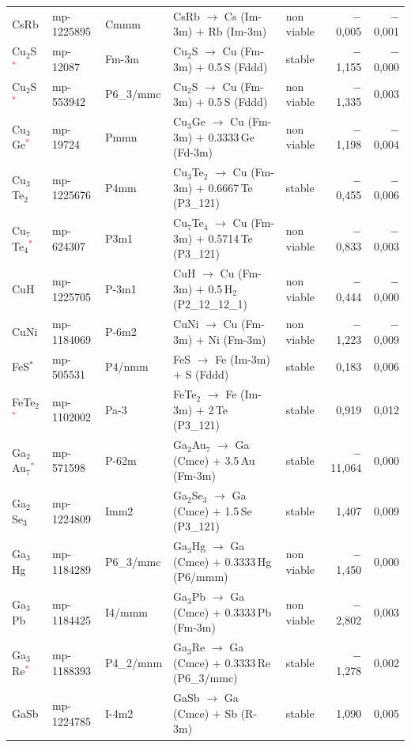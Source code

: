 \begin{longtable}{@{}ll l@{\hspace{4pt}} p{4.6cm} l@{\hspace{4pt}} rr@{}}
CsRb & mp-1225895 & Cmmm & CsRb $\to$ Cs (Im-3m) $+$ Rb (Im-3m) & non viable & $-$0{,}005 & $-$0{,}001 \\
Cu$_{2}$S\textcolor{red}{$^*$} & mp-12087 & Fm-3m & Cu$_{2}$S $\to$ Cu (Fm-3m) $+$ 0.5\,S (Fddd) & stable & $-$1{,}155 & $-$0{,}000 \\
Cu$_{2}$S\textcolor{red}{$^*$} & mp-553942 & P6\_3/mmc & Cu$_{2}$S $\to$ Cu (Fm-3m) $+$ 0.5\,S (Fddd) & non viable & $-$1{,}335 & 0{,}003 \\
Cu$_{3}$Ge\textcolor{red}{$^*$} & mp-19724 & Pmmn & Cu$_{3}$Ge $\to$ Cu (Fm-3m) $+$ 0.3333\,Ge (Fd-3m) & non viable & $-$1{,}198 & $-$0{,}004 \\
Cu$_{3}$Te$_{2}$ & mp-1225676 & P4mm & Cu$_{3}$Te$_{2}$ $\to$ Cu (Fm-3m) $+$ 0.6667\,Te (P3\_121) & stable & $-$0{,}455 & $-$0{,}006 \\
Cu$_{7}$Te$_{4}$\textcolor{red}{$^*$} & mp-624307 & P3m1 & Cu$_{7}$Te$_{4}$ $\to$ Cu (Fm-3m) $+$ 0.5714\,Te (P3\_121) & non viable & $-$0{,}833 & $-$0{,}003 \\
CuH & mp-1225705 & P-3m1 & CuH $\to$ Cu (Fm-3m) $+$ 0.5\,H$_{2}$ (P2\_12\_12\_1) & non viable & $-$0{,}444 & $-$0{,}000 \\
CuNi & mp-1184069 & P-6m2 & CuNi $\to$ Cu (Fm-3m) $+$ Ni (Fm-3m) & non viable & $-$1{,}223 & $-$0{,}009 \\
FeS$^*$ & mp-505531 & P4/nmm & FeS $\to$ Fe (Im-3m) $+$ S (Fddd) & stable & 0{,}183 & 0{,}006 \\
FeTe$_{2}$\textcolor{red}{$^*$} & mp-1102002 & Pa-3 & FeTe$_{2}$ $\to$ Fe (Im-3m) $+$ 2\,Te (P3\_121) & stable & 0{,}919 & 0{,}012 \\
Ga$_{2}$Au$_{7}$\textcolor{red}{$^*$} & mp-571598 & P-62m & Ga$_{2}$Au$_{7}$ $\to$ Ga (Cmce) $+$ 3.5\,Au (Fm-3m) & stable & $-$11{,}064 & 0{,}000 \\
Ga$_{2}$Se$_{3}$ & mp-1224809 & Imm2 & Ga$_{2}$Se$_{3}$ $\to$ Ga (Cmce) $+$ 1.5\,Se (P3\_121) & stable & 1{,}407 & 0{,}009 \\
Ga$_{3}$Hg & mp-1184289 & P6\_3/mmc & Ga$_{3}$Hg $\to$ Ga (Cmce) $+$ 0.3333\,Hg (P6/mmm) & non viable & $-$1{,}450 & 0{,}000 \\
Ga$_{3}$Pb & mp-1184425 & I4/mmm & Ga$_{3}$Pb $\to$ Ga (Cmce) $+$ 0.3333\,Pb (Fm-3m) & non viable & $-$2{,}802 & 0{,}003 \\
Ga$_{3}$Re\textcolor{red}{$^*$} & mp-1188393 & P4\_2/mnm & Ga$_{3}$Re $\to$ Ga (Cmce) $+$ 0.3333\,Re (P6\_3/mmc) & stable & $-$1{,}278 & 0{,}002 \\
GaSb & mp-1224785 & I-4m2 & GaSb $\to$ Ga (Cmce) $+$ Sb (R-3m) & stable & 1{,}090 & 0{,}005 \\

\end{longtable}
